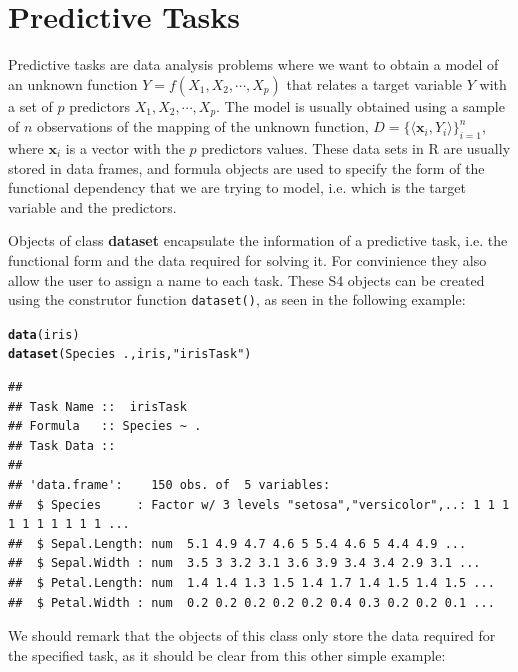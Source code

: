 \documentclass[10pt,a4paper]{article}\usepackage[]{graphicx}\usepackage[]{color}
\makeatletter
\newcommand{\hlstr}[1]{\textcolor[rgb]{0.192,0.494,0.8}{#1}}%
\newcommand{\hlopt}[1]{\textcolor[rgb]{0,0,0}{#1}}%
\newcommand{\hlstd}[1]{\textcolor[rgb]{0.345,0.345,0.345}{#1}}%
\newcommand{\hlkwd}[1]{\textcolor[rgb]{0.737,0.353,0.396}{\textbf{#1}}}%
\newenvironment{kframe}{%
 \def\at@end@of@kframe{}%
 \ifinner\ifhmode%
  \def\at@end@of@kframe{\end{minipage}}%
  \begin{minipage}{\columnwidth}%
 \fi\fi%
 \def\FrameCommand##1{\hskip\@totalleftmargin \hskip-\fboxsep
 \colorbox{shadecolor}{##1}\hskip-\fboxsep
     \hskip-\linewidth \hskip-\@totalleftmargin \hskip\columnwidth}%
 \MakeFramed {\advance\hsize-\width
   \@totalleftmargin\z@ \linewidth\hsize
   \@setminipage}}%
 {\par\unskip\endMakeFramed%
 \at@end@of@kframe}
\newenvironment{knitrout}{}{} %
\makeatother
\begin{document}
\section{Predictive Tasks}

Predictive tasks are data analysis problems where we want to obtain a
model of an unknown function $Y=f(X_1, X_2, \cdots, X_p)$ that relates
a target variable $Y$ with a set of $p$ predictors $X_1, X_2, \cdots,
X_p$. The model is usually obtained using a sample of $n$ observations
of the mapping of the unknown function, $D=\{\langle \mathbf{x}_i,
Y_i\rangle\}_{i=1}^n$, where $\mathbf{x}_i$ is a vector with the $p$
predictors values.  These data sets in R are usually stored in data
frames, and formula objects are used to specify the form of the
functional dependency that we are trying to model, i.e. which is the
target variable and the predictors.

Objects of class \textbf{dataset} encapsulate the information of a
predictive task, i.e. the functional form and the data required for
solving it. For convinience they also allow the user to assign a name
to each task. These S4 objects can be created using the construtor
function \texttt{dataset()}, as seen in the following example:

\begin{knitrout}
\color{fgcolor}\begin{kframe}
\begin{alltt}
\hlkwd{data}\hlstd{(iris)}
\hlkwd{dataset}\hlstd{(Species} \hlopt{~} \hlstd{., iris,} \hlstr{"irisTask"}\hlstd{)}
\end{alltt}
\begin{verbatim}
## 
## Task Name ::  irisTask
## Formula   :: Species ~ .
## Task Data ::
## 
## 'data.frame':	150 obs. of  5 variables:
##  $ Species     : Factor w/ 3 levels "setosa","versicolor",..: 1 1 1 1 1 1 1 1 1 1 ...
##  $ Sepal.Length: num  5.1 4.9 4.7 4.6 5 5.4 4.6 5 4.4 4.9 ...
##  $ Sepal.Width : num  3.5 3 3.2 3.1 3.6 3.9 3.4 3.4 2.9 3.1 ...
##  $ Petal.Length: num  1.4 1.4 1.3 1.5 1.4 1.7 1.4 1.5 1.4 1.5 ...
##  $ Petal.Width : num  0.2 0.2 0.2 0.2 0.2 0.4 0.3 0.2 0.2 0.1 ...
\end{verbatim}
\end{kframe}
\end{knitrout}


We should remark that the objects of this class only store the data
required for the specified task, as it should be clear from this other
simple example:
\end{document}

